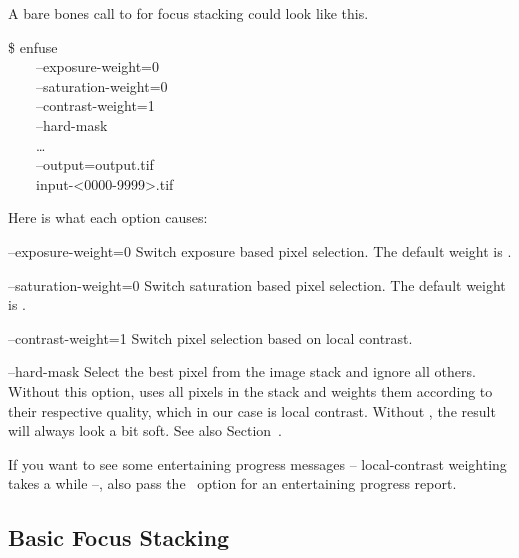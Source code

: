 A bare bones call to \App{} for focus stacking could look like this.
\begin{terminal}
  \$ enfuse \bslash \\
  ~~~~--exposure-weight=0 \bslash \\
  ~~~~--saturation-weight=0 \bslash \\
  ~~~~--contrast-weight=1 \bslash \\
  ~~~~--hard-mask \bslash \\
  ~~~~\dots{} \bslash \\
  ~~~~--output=output.tif \bslash \\
  ~~~~input-<0000-9999>.tif
\end{terminal}

Here is what each option causes:

\begin{codelist}
\item[--exposure-weight=0]\itemend Switch  exposure based
  pixel selection.  The default weight is
  .

\item[--saturation-weight=0]\itemend Switch  saturation
  based pixel selection.  The default weight is
  .

\item[--contrast-weight=1]\itemend Switch  pixel selection
  based on local contrast.

\item[--hard-mask]\itemend Select the best pixel from the image stack
  and ignore all others.  Without this option, \App{} uses all pixels
  in the stack and weights them according to their respective quality,
  which in our case is local contrast.  Without ,
  the result will always look a bit soft.  See also
  Section~.
\end{codelist}

If you want to see some entertaining progress messages --
local-contrast weighting takes a while --, also pass the
~option for an entertaining progress report.


\subsection[Basic Focus Stacking]{Basic Focus Stacking
  \label{sec:basic-focus-stacking}
  }


